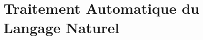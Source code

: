 \documentclass[12pt]{report}
\begin{document}
\renewcommand{\contentsname}{Sommaire}
\tableofcontents
\listoffigures
\listoftables



% 

\chapter{Traitement Automatique du Langage Naturel}




 

\end{document}
